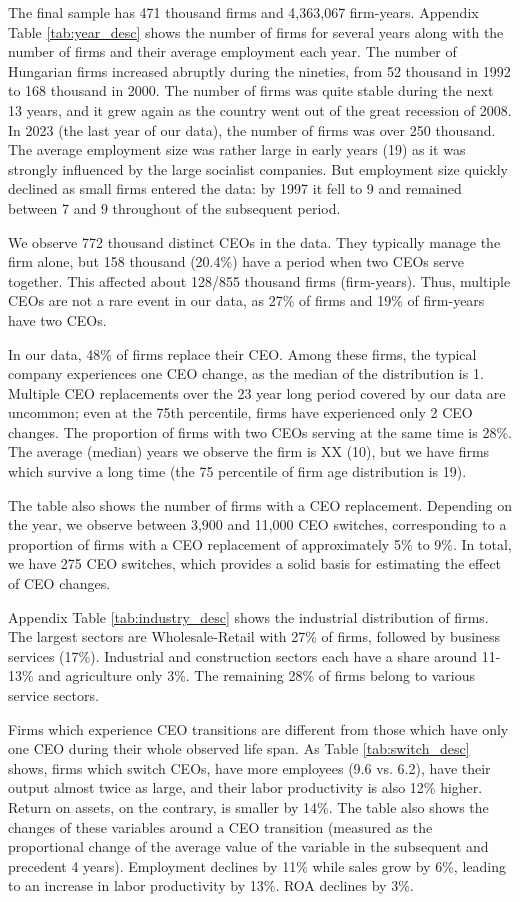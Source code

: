\documentclass[11pt,a4paper]{article}
\begin{document}
The final sample has 471 thousand firms and 4,363,067 firm-years. Appendix Table \ref{tab:year_desc} shows the number of firms for several years along with the number of firms and their average employment each year. The number of Hungarian firms increased abruptly during the nineties, from 52 thousand in 1992 to 168 thousand in 2000. The number of firms was quite stable during the next 13 years, and it grew again as the country went out of the great recession of 2008. In 2023 (the last year of our data), the number of firms was over 250 thousand. The average employment size was rather large in early years (19) as it was strongly influenced by the large socialist companies. But employment size quickly declined as small firms entered the data: by 1997 it fell to 9 and remained between 7 and 9 throughout of the subsequent period.

We observe 772 thousand distinct CEOs in the data. They typically manage the firm alone, but 158 thousand (20.4\%) have a period when two CEOs serve together. This affected about 128/855 thousand firms (firm-years). Thus, multiple CEOs are not a rare event in our data, as 27\% of firms and 19\% of firm-years have two CEOs.

In our data, 48\% of firms replace their CEO. Among these firms, the typical company experiences one CEO change, as the median of the distribution is 1. Multiple CEO replacements over the 23 year long period covered by our data are uncommon; even at the 75th percentile, firms have experienced only 2 CEO changes. The proportion of firms with two CEOs serving at the same time is 28\%. The average (median) years we observe the firm is XX (10), but we have firms which survive a long time (the 75 percentile of firm age distribution is 19).

The table also shows the number of firms with a CEO replacement. Depending on the year, we observe between 3,900 and 11,000 CEO switches, corresponding to a proportion of firms with a CEO replacement of approximately 5\% to 9\%. In total, we have 275 CEO switches, which provides a solid basis for estimating the effect of CEO changes.

Appendix Table \ref{tab:industry_desc} shows the industrial distribution of firms. The largest sectors are Wholesale-Retail with 27\% of firms, followed by business services (17\%).  Industrial and construction sectors each have a share around 11-13\% and agriculture only 3\%. The remaining 28\% of firms belong to various service sectors.

Firms which experience CEO transitions are different from those which have only one CEO during their whole observed life span. As Table \ref{tab:switch_desc} shows, firms which switch CEOs, have more employees (9.6 vs. 6.2), have their output almost twice as large, and their labor productivity is also 12\% higher. Return on assets, on the contrary, is smaller by 14\%. The table also shows the changes of these variables around a CEO transition (measured as the proportional change of the average value of the variable in the subsequent and precedent 4 years). Employment declines by 11\% while sales grow by 6\%, leading to an increase in labor productivity by 13\%. ROA declines by 3\%.  
\end{document}
